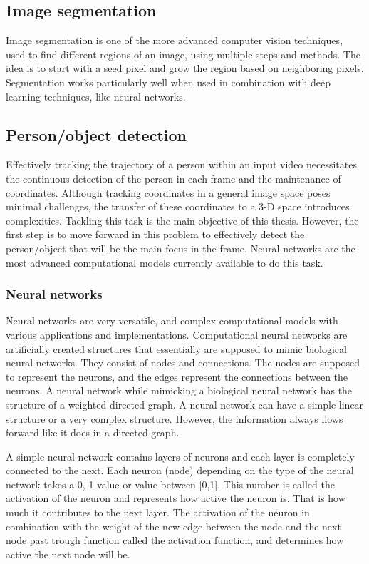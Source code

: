 \subsection{Image segmentation}

Image segmentation is one of the more advanced computer vision techniques, used to find different regions of an image, using multiple steps and methods. The idea is to start with a seed pixel and grow the region based on neighboring pixels. Segmentation works particularly well when used in combination with deep learning techniques, like neural networks.

\subsection{Person/object detection }

Effectively tracking the trajectory of a person within an input video necessitates the continuous detection of the person in each frame and the maintenance of coordinates. Although tracking coordinates in a general image space poses minimal challenges, the transfer of these coordinates to a 3-D space introduces complexities. Tackling this task is the main objective of this thesis. However, the first step is to move forward in this problem to effectively detect the person/object that will be the main focus in the frame. Neural networks are the most advanced computational models currently available to do this task.

\subsubsection{Neural networks}

Neural networks are very versatile, and complex computational models with various applications and implementations. Computational neural networks are artificially created structures that essentially are supposed to mimic biological neural networks. They consist of nodes and connections. The nodes are supposed to represent the neurons, and the edges represent the connections between the neurons. A neural network while mimicking a biological neural network has the structure of a weighted directed graph. A neural network can have a simple linear structure or a very complex structure. However, the information always flows forward like it does in a directed graph.\newline

A simple neural network contains layers of neurons and each layer is completely connected to the next. Each neuron (node) depending on the type of the neural network takes a {0}, {1} value or value between [0,1]. This number is called the activation of the neuron and represents how active the neuron is. That is how much it contributes to the next layer. The activation of the neuron in combination with the weight of the new edge between the node and the next node past trough function called the activation function, and determines how active the next node will be.\newline


